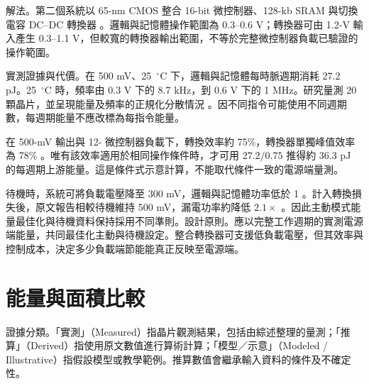 \textnormal{解法。}第二個系統以 65-nm CMOS 整合 16-bit 微控制器、128-kb SRAM 與切換電容 DC--DC 轉換器 \cite[Sec.~VI-B]{udvs2010}。邏輯與記憶體操作範圍為 0.3--0.6 V；轉換器可由 1.2-V 輸入產生 0.3--1.1 V，但較寬的轉換器輸出範圍，不等於完整微控制器負載已驗證的操作範圍。

\textnormal{實測證據與代價。}在 500 mV、25~$^\circ$C 下，邏輯與記憶體每時脈週期消耗 27.2 pJ。25~$^\circ$C 時，頻率由 0.3 V 下的 8.7 kHz，到 0.6 V 下的 1 MHz。研究量測 20 顆晶片，並呈現能量及頻率的正規化分散情況 \cite[Fig.~23]{udvs2010}。因不同指令可能使用不同週期數，每週期能量不應改標為每指令能量。

在 500-mV 輸出與 12-\uW{} 微控制器負載下，轉換效率約 75\%，轉換器單獨峰值效率為 78\% \cite[Fig.~24]{udvs2010}。唯有該效率適用於相同操作條件時，才可用 $27.2/0.75$ 推得約 36.3 pJ 的每週期上游能量。這是條件式示意計算，不能取代條件一致的電源端量測。

待機時，系統可將負載電壓降至 300 mV，邏輯與記憶體功率低於 1 \uW。計入轉換損失後，原文報告相較待機維持 500 mV，漏電功率約降低 $2.1\times$ \cite[Fig.~25]{udvs2010}。因此主動模式能量最佳化與待機資料保持採用不同準則。\textnormal{設計原則。}應以完整工作週期的實測電源端能量，共同最佳化主動與待機設定。整合轉換器可支援低負載電壓，但其效率與控制成本，決定多少負載端節能能真正反映至電源端。

\section{能量與面積比較}
\textnormal{證據分類。}「實測」（Measured）指晶片觀測結果，包括由綜述整理的量測；「推算」（Derived）指使用原文數值進行算術計算；「模型／示意」（Modeled / Illustrative）指假設模型或教學範例。推算數值會繼承輸入資料的條件及不確定性。

